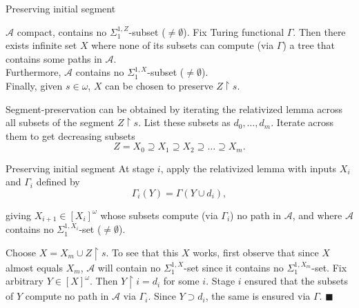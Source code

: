 \begin{frame}{Preserving initial segment}
  \begin{main-lemma*}
    $\mathcal{A}$ compact, contains no $\Sigma_1^{1,Z}$-subset
    ($\neq\emptyset$). Fix Turing functional $\Gamma$. Then there exists
    infinite set $X$ where none of its subsets can compute (via $\Gamma$) a
    tree that contains some paths in $\mathcal{A}$.\\
    \vspace{0.5em}
    Furthermore, $\mathcal{A}$ contains no $\Sigma_1^{1,X}$-subset
    ($\neq\emptyset$).\\
    \vspace{0.5em}
    Finally, given $s\in\omega$, $X$ can be chosen to preserve
    $Z\restriction s$.
  \end{main-lemma*}

  \vspace{0.5em}
  Segment-preservation can be obtained by iterating the relativized lemma
  across all subsets of the segment $Z\restriction s$. List these subsets
  as $d_0,\ldots,d_m$. Iterate across them to get decreasing subsets
  \[Z=X_0 \supseteq X_1 \supseteq X_2 \supseteq\ldots \supseteq X_m.\]
\end{frame}

\begin{frame}{Preserving initial segment}
  At stage $i$, apply the relativized lemma with inputs $X_i$ and
  $\Gamma_i$ defined by
  \[\Gamma_i(Y) =\Gamma(Y\cup d_i),\]

  giving $X_{i+1}\in[X_i]^\omega$ whose subsets compute (via
  $\Gamma_i$) no path in $\mathcal{A}$, and where $\mathcal{A}$ contains no
  $\Sigma_1^{1,X_i}$-set ($\neq\emptyset$).

  \vspace{0.5em}
  Choose $X=X_m\cup Z\restriction s$. To see that this $X$ works, first
  observe that since $X$ almost equals $X_m$, $\mathcal{A}$ will
  contain no $\Sigma_1^{1,X}$-set since it contains no
  $\Sigma_1^{1,X_m}$-set. Fix arbitrary $Y\in[X]^\omega$. Then
  $Y\restriction i=d_i$ for some $i$. Stage $i$ ensured that the subsets of
  $Y$ compute no path in $\mathcal{A}$ via $\Gamma_i$. Since $Y\supset
  d_i$, the same is ensured via $\Gamma$. $\blacksquare$
\end{frame}

